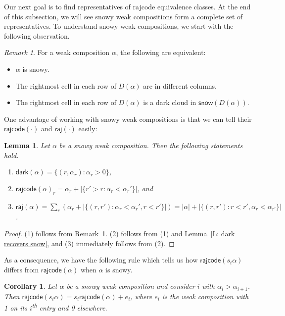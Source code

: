 \documentclass[10pt]{amsart}
\theoremstyle{plain}
\newtheorem{cor}[cor]{Corollary}
\theoremstyle{plain}
\theoremstyle{definition}
\theoremstyle{definition}
\theoremstyle{definition}
\theoremstyle{plain}
\theoremstyle{plain}
\theoremstyle{plain}
\newtheorem{lemma}[lemma]{Lemma}
\theoremstyle{plain}
\theoremstyle{plain}
\theoremstyle{remark}
\newtheorem{rem}[rem]{Remark}
\theoremstyle{remark}
\theoremstyle{plain}
\theoremstyle{plain}
\newcommand{\dark}{\mathsf{dark}}
\newcommand{\snow}{\mathsf{snow}}
\newcommand{\rajcode}{\mathsf{rajcode}}
\newcommand{\raj}{\mathsf{raj}}
\begin{document}
Our next goal is to find representatives
of rajcode equivalence classes. 
At the end of this subsection, 
we will see snowy weak compositions form
a complete set of representatives. 
To understand snowy weak compositions, 
we start with the following observation. 

\begin{rem}
\label{R: snowy}
For a weak composition $\alpha$,
the following are equivalent:
\begin{itemize}
\item $\alpha$ is snowy.
\item The rightmost cell in each row of $D(\alpha)$
are in different columns. 
\item The rightmost cell in each row of $D(\alpha)$
is a dark cloud in $\snow(D(\alpha))$. 
\end{itemize}
\end{rem}

One advantage of working with snowy weak compositions
is that 
we can tell their 
$\rajcode(\cdot)$ and $\raj(\cdot)$ easily:
\begin{lemma}
\label{L: dark, rajcode and raj of snowy weak composition}
Let $\alpha$ be a snowy weak composition.
Then the following statements hold.
\begin{enumerate}
\item $\dark(\alpha) = \{(r,\alpha_r): \alpha_r > 0\}$,\label{snowy.weak.1}
\item $\rajcode(\alpha)_r = \alpha_r + |\{r' > r: \alpha_r < \alpha_r'\}|$, and \label{snowy.weak.2}
\item $\raj(\alpha) = \sum_r (\alpha_r + |\{(r, r'): \alpha_r < \alpha_r', r < r'\}|) = |\alpha| + |\{(r, r'): r < r', \alpha_r < \alpha_{r'}\}|$.\label{snowy.weak.3}
\end{enumerate}
\end{lemma}
\begin{proof}
(1) follows from Remark~\ref{R: snowy}.
(2) follows from (1) and Lemma~\ref{L: dark recovers snow}, and 
(3) immediately follows from (2). 
\end{proof}

As a consequence, we have the following rule which tells us 
how $\rajcode(s_i\alpha)$ differs from 
$\rajcode(\alpha)$ when $\alpha$ is snowy. 

\begin{cor}
\label{C: snowy changes}
Let $\alpha$ be a snowy weak composition and consider $i$ with $\alpha_i > \alpha_{i+1}$.
Then $\rajcode(s_i\alpha) = s_i\rajcode(\alpha) + e_i$,
where $e_i$ is the weak composition with
1 on its $i$\textsuperscript{th} entry and 0 elsewhere.
\end{cor}
\end{document}
